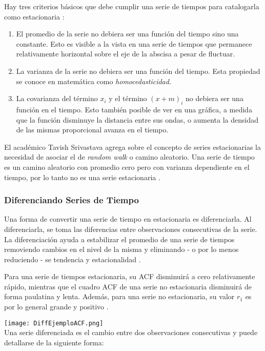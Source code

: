 Hay tres criterios básicos que debe cumplir una serie de tiempos para catalogarla como estacionaria \cite{srivastava}:

\begin{enumerate}
	\item El promedio de la serie no debiera ser una función del tiempo sino una constante. Esto es visible a la vista en una serie de tiempos que permanece relativamente horizontal sobre el eje de la abscisa a pesar de fluctuar.
	\item La varianza de la serie no debiera ser una función del tiempo. Esta propiedad se conoce en matemática como \emph{homocedasticidad}.
    \item La covarianza del término $x_i$ y el término $(x + m)_i$ no debiera ser una función en el tiempo. Esto también posible de ver en una gráfica, a medida que la función disminuye la distancia entre sus ondas, o aumenta la densidad de las mismas proporcional avanza en el tiempo.
\end{enumerate}

El académico Tavish Srivastava agrega sobre el concepto de series estacionarias la necesidad de asociar el de \emph{random walk} o camino aleatorio. Una serie de tiempo es un camino aleatorio con promedio cero pero con varianza dependiente en el tiempo, por lo tanto no es una serie estacionaria \cite{srivastava}.

\subsubsection{Diferenciando Series de Tiempo}
Una forma de convertir una serie de tiempo en estacionaria es diferenciarla. Al diferenciarla, se toma las diferencias entre observaciones consecutivas de la serie. La diferenciación ayuda a estabilizar el promedio de una serie de tiempos removiendo cambios en el nivel de la misma y eliminando - o por lo menos reduciendo - se tendencia y estacionalidad \cite{hyndman}.

Para una serie de tiempos estacionaria, su ACF disminuirá a cero relativamente rápido, mientras que el cuadro ACF de una serie no estacionaria disminuirá de forma paulatina y lenta. Además, para una serie no estacionaria, su valor $r_1$ es por lo general grande y positivo \cite{hyndman}.

\texttt{[image: DiffEjemploACF.png]}\\

Una serie diferenciada es el cambio entre dos observaciones consecutivas y puede detallarse de la siguiente forma:

